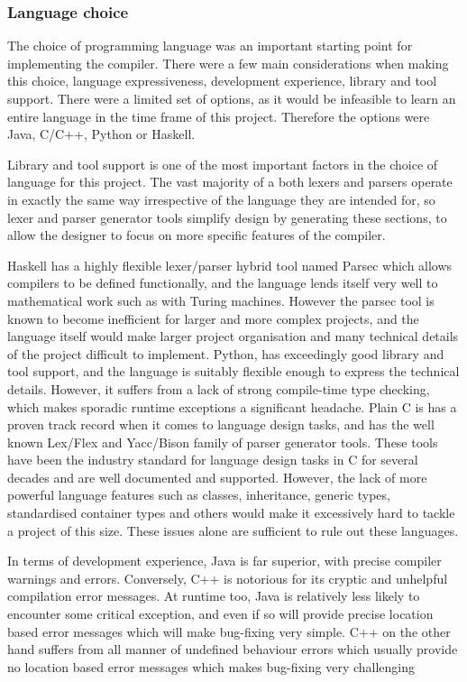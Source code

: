 \documentclass[11pt]{article}
\begin{document}
\subsubsection{Language choice}

The choice of programming language was an important starting point for implementing the compiler. There were a few main considerations when making this choice, language expressiveness, development experience, library and tool support. There were a limited set of options, as it would be infeasible to learn an entire language in the time frame of this project. Therefore the options were Java, C/C++, Python or Haskell.

Library and tool support is one of the most important factors in the choice of language for this project. The vast majority of a both lexers and parsers operate in exactly the same way irrespective of the language they are intended for, so lexer and parser generator tools simplify design by generating these sections, to allow the designer to focus on more specific features of the compiler.

Haskell has a highly flexible lexer/parser hybrid tool named Parsec which allows compilers to be defined functionally, and the language lends itself very well to mathematical work such as with Turing machines. However the parsec tool is known to become inefficient for larger and more complex projects, and the language itself would make larger project organisation and many technical details of the project difficult to implement. Python, has exceedingly good library and tool support, and the language is suitably flexible enough to express the technical details. However, it suffers from a lack of strong compile-time type checking, which makes sporadic runtime exceptions a significant headache. Plain C is has a proven track record when it comes to language design tasks, and has the well known Lex/Flex and Yacc/Bison family of parser generator tools. These tools have been the industry standard for language design tasks in C for several decades and are well documented and supported. However, the lack of more powerful language features such as classes, inheritance, generic types, standardised container types and others would make it excessively hard to tackle a project of this size. These issues alone are sufficient to rule out these languages.

In terms of development experience, Java is far superior, with precise compiler warnings and errors. Conversely, C++ is notorious for its cryptic and unhelpful compilation error messages. At runtime too, Java is relatively less likely to encounter some critical exception, and even if so will provide precise location based error messages which will make bug-fixing very simple. C++ on the other hand suffers from all manner of undefined behaviour errors which usually provide no location based error messages which makes bug-fixing very challenging
\end{document}

